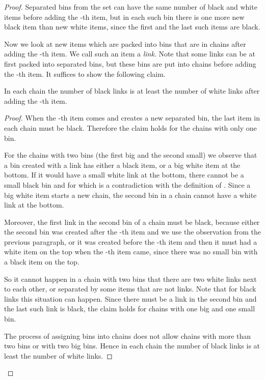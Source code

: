 \documentclass[11pt,a4paper]{article}
\begin{document}
\begin{proof}
Separated bins from the set  can have the same number of black and white items before adding the -th item,
but in each such bin there is one more new black item than new white items,
since the first and the last such items are black.

Now we look at new items which are packed into bins that are in chains after adding the -th item.
We call such an item a \textit{link}.
Note that some links can be at first packed into separated bins, but these bins are put into chains before adding the -th item.
It suffices to show the following claim. 

\begin{claim}
In each chain the number of black links is at least the number of white links after adding the -th item.
\end{claim}

\begin{proof}

When the -th item comes and creates a new separated bin, the last item in each chain must be black.
Therefore the claim holds for the chains with only one bin.

For the chains with two bins (the first big and the second small) we observe 
that a bin created with a link has either a black item, or a big white item at the bottom.
If it would have a small white link at the bottom, there cannot be a small black bin and  for 
which is a contradiction with the definition of .
Since a big white item starts a new chain, the second bin in a chain cannot have a white link at the bottom.

Moreover, the first link in the second bin of a chain must be black,
because either the second bin was created after the -th item and we use the observation from the previous paragraph,
or it was created before the -th item and then it must had a white item on the top when the -th item came,
since there was no small bin with a black item on the top.

So it cannot happen in a chain with two bins that there are two white links next to each other,
or separated by some items that are not links.
Note that for black links this situation can happen.
Since there must be a link in the second bin and the last such link is black,
the claim holds for chains with one big and one small bin.

The process of assigning bins into chains does not allow chains with more than two bins or with two big bins.
Hence in each chain the number of black links is at least the number of white links.
\end{proof}


\end{proof}
\end{document}
